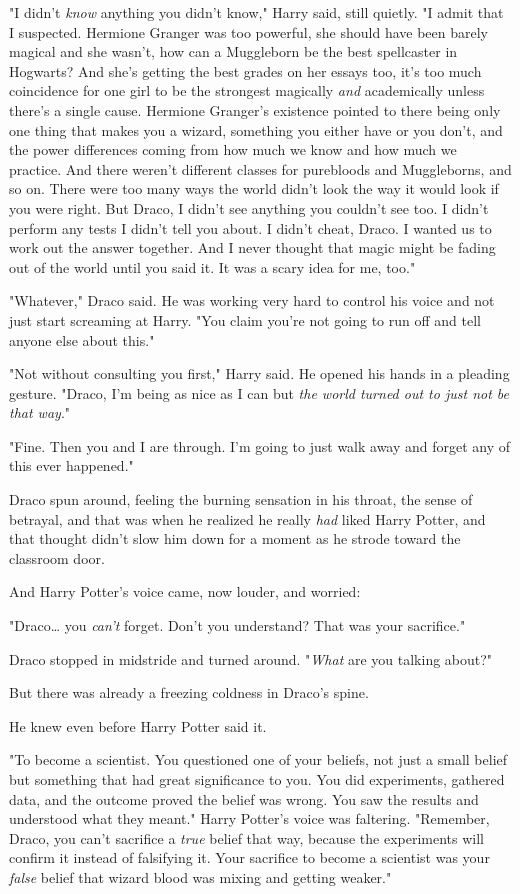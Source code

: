 "I didn't \emph{know} anything you didn't know," Harry said, still quietly. "I
admit that I suspected. Hermione Granger was too powerful, she should have been
barely magical and she wasn't, how can a Muggleborn be the best spellcaster in
Hogwarts? And she's getting the best grades on her essays too, it's too much
coincidence for one girl to be the strongest magically \emph{and} academically
unless there's a single cause. Hermione Granger's existence pointed to there
being only one thing that makes you a wizard, something you either have or you
don't, and the power differences coming from how much we know and how much we
practice. And there weren't different classes for purebloods and Muggleborns,
and so on. There were too many ways the world didn't look the way it would look
if you were right. But Draco, I didn't see anything you couldn't see too. I
didn't perform any tests I didn't tell you about. I didn't cheat, Draco. I
wanted us to work out the answer together. And I never thought that magic might
be fading out of the world until you said it. It was a scary idea for me, too."

"Whatever," Draco said. He was working very hard to control his voice and not
just start screaming at Harry. "You claim you're not going to run off and tell
anyone else about this."

"Not without consulting you first," Harry said. He opened his hands in a
pleading gesture. "Draco, I'm being as nice as I can but \emph{the world turned
out to just not be that way}."

"Fine. Then you and I are through. I'm going to just walk away and forget any
of this ever happened."

Draco spun around, feeling the burning sensation in his throat, the sense of
betrayal, and that was when he realized he really \emph{had} liked Harry
Potter, and that thought didn't slow him down for a moment as he strode toward
the classroom door.

And Harry Potter's voice came, now louder, and worried:

"Draco{\ldots} you \emph{can't} forget. Don't you understand? That was your
sacrifice."

Draco stopped in midstride and turned around. "\emph{What} are you talking
about?"

But there was already a freezing coldness in Draco's spine.

He knew even before Harry Potter said it.

"To become a scientist. You questioned one of your beliefs, not just a small
belief but something that had great significance to you. You did experiments,
gathered data, and the outcome proved the belief was wrong. You saw the results
and understood what they meant." Harry Potter's voice was faltering. "Remember,
Draco, you can't sacrifice a \emph{true} belief that way, because the
experiments will confirm it instead of falsifying it. Your sacrifice to become
a scientist was your \emph{false} belief that wizard blood was mixing and
getting weaker."

